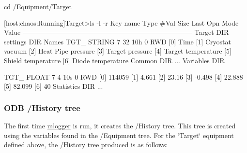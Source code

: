 \begin{DoxyCode}
cd /Equipment/Target

[host:chaos:Running]Target>ls -l -r
Key name                        Type    #Val  Size  Last Opn Mode Value
---------------------------------------------------------------------------
Target                          DIR
    settings                    DIR
        Names TGT_              STRING  7     32    10h  0   RWD  
                                        [0]             Time
                                        [1]             Cryostat vacuum
                                        [2]             Heat Pipe pressure
                                        [3]             Target pressure
                                        [4]             Target temperature
                                        [5]             Shield temperature
                                        [6]             Diode temperature
    Common                      DIR
          ...
    Variables                   DIR

        TGT_                    FLOAT   7     4     10s  0   RWD  
                                        [0]             114059
                                        [1]             4.661
                                        [2]             23.16
                                        [3]             -0.498
                                        [4]             22.888
                                        [5]             82.099
                                        [6]             40
    Statistics                  DIR
          ...
\end{DoxyCode}


\par
 

 \par
 \label{F_History_logging_idx_history_ODB-tree}
\hypertarget{F_History_logging_idx_history_ODB-tree}{}
 \label{F_History_logging_idx_ODB_tree_History}
\hypertarget{F_History_logging_idx_ODB_tree_History}{}
\hypertarget{F_History_logging_F_ODB_History_tree}{}\subsubsection{ODB /History tree}\label{F_History_logging_F_ODB_History_tree}
\label{F_History_logging_idx_logger_utility_mlogger}
\hypertarget{F_History_logging_idx_logger_utility_mlogger}{}
 The first time \hyperlink{F_Logging_F_mlogger_utility}{mlogger} is run, it creates the /History  tree. This tree is created using the variables found in the /Equipment tree. For the \char`\"{}Target\char`\"{} equipment defined above, the /History tree produced is as follows:


